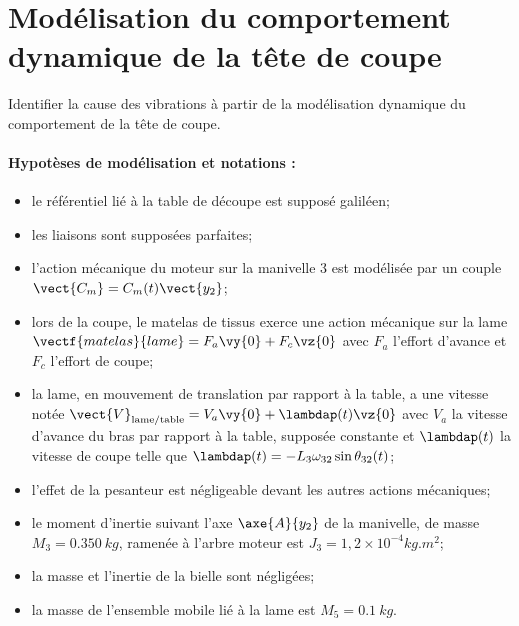\section{Modélisation du comportement dynamique de la tête de coupe}
\begin{obj}
Identifier la cause des vibrations à partir de la modélisation dynamique du comportement
 de la tête de coupe.
\end{obj}


\paragraph*{Hypotèses de modélisation et notations :}
\begin{itemize}
\item le référentiel lié à la table de découpe est supposé galiléen;
\item les liaisons sont supposées parfaites;
\item l’action mécanique du moteur sur la manivelle 3 est modélisée par un couple $\vect{C_m} = C_m(t)\vect{y_2}$;
\item lors de la coupe, le matelas de tissus exerce une action mécanique sur la lame $\vectf{matelas}{lame} = F_a \vy{0}+F_c\vz{0}$ avec $F_a$ l’effort d’avance et $F_c$ l’effort de coupe;
\item la lame, en mouvement de translation par rapport à la table, a une vitesse notée
$\vect{V}_{\text{lame/table}} = V_a \vy{0} + \lambdap(t) \vz{0}$ avec $V_a$ la vitesse d’avance du bras par rapport à la table, supposée constante et $\lambdap(t)$ la vitesse de coupe telle que
$\lambdap (t)=-L_3 \omega_{32} \sin \theta_{32}(t)$;
\item l’effet de la pesanteur est négligeable devant les autres actions mécaniques;
\item le moment d’inertie suivant l’axe $\axe{A}{y_2}$ de la manivelle, de masse $M_3=\SI{0,350}{kg}$, ramenée à l’arbre moteur est $J_3=1,2 \times 10^{-4} \si{kg.m^2}$;
\item la masse et l’inertie de la bielle sont négligées;
\item la masse de l’ensemble mobile lié à la lame est $M_5= \SI{0,1}{kg}$.
\end{itemize}




